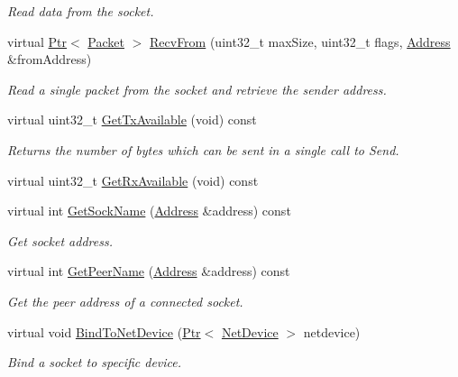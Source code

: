 \begin{DoxyCompactItemize}
\begin{DoxyCompactList}\small\item\em Read data from the socket. \end{DoxyCompactList}\item 
virtual \hyperlink{classns3_1_1Ptr}{Ptr}$<$ \hyperlink{classns3_1_1Packet}{Packet} $>$ \hyperlink{classns3_1_1TcpSocketBase_afbfc81cc21495573d75cb0546502da9a}{Recv\+From} (uint32\+\_\+t max\+Size, uint32\+\_\+t flags, \hyperlink{classns3_1_1Address}{Address} \&from\+Address)
\begin{DoxyCompactList}\small\item\em Read a single packet from the socket and retrieve the sender address. \end{DoxyCompactList}\item 
virtual uint32\+\_\+t \hyperlink{classns3_1_1TcpSocketBase_aa2d8e1962f46031bae6f92bd9c30a068}{Get\+Tx\+Available} (void) const 
\begin{DoxyCompactList}\small\item\em Returns the number of bytes which can be sent in a single call to Send. \end{DoxyCompactList}\item 
virtual uint32\+\_\+t \hyperlink{classns3_1_1TcpSocketBase_acc09fa5cc37944a1630be0d1bdcec33e}{Get\+Rx\+Available} (void) const 
\item 
virtual int \hyperlink{classns3_1_1TcpSocketBase_a0a1ee7f59726c5da47a1a6ab4dad46e8}{Get\+Sock\+Name} (\hyperlink{classns3_1_1Address}{Address} \&address) const 
\begin{DoxyCompactList}\small\item\em Get socket address. \end{DoxyCompactList}\item 
virtual int \hyperlink{classns3_1_1TcpSocketBase_a3fe3f208498b8735a9ed0754940ec06c}{Get\+Peer\+Name} (\hyperlink{classns3_1_1Address}{Address} \&address) const 
\begin{DoxyCompactList}\small\item\em Get the peer address of a connected socket. \end{DoxyCompactList}\item 
virtual void \hyperlink{classns3_1_1TcpSocketBase_a88b552dfa0a85e0224ed8a7dc140f190}{Bind\+To\+Net\+Device} (\hyperlink{classns3_1_1Ptr}{Ptr}$<$ \hyperlink{classns3_1_1NetDevice}{Net\+Device} $>$ netdevice)
\begin{DoxyCompactList}\small\item\em Bind a socket to specific device. \end{DoxyCompactList}\end{DoxyCompactItemize}
